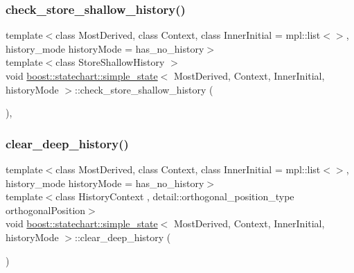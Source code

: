 \mbox{\label{classboost_1_1statechart_1_1simple__state_a526c05c663958e216ab04dbdbf7ba6c5}} 
\subsubsection{\texorpdfstring{check\+\_\+store\+\_\+shallow\+\_\+history()}{check\_store\_shallow\_history()}}
{\footnotesize\ttfamily template$<$class Most\+Derived, class Context, class Inner\+Initial = mpl\+::list$<$$>$, history\+\_\+mode history\+Mode = has\+\_\+no\+\_\+history$>$ \\
template$<$class Store\+Shallow\+History $>$ \\
void \mbox{\hyperlink{classboost_1_1statechart_1_1simple__state}{boost\+::statechart\+::simple\+\_\+state}}$<$ Most\+Derived, Context, Inner\+Initial, history\+Mode $>$\+::check\+\_\+store\+\_\+shallow\+\_\+history (\begin{DoxyParamCaption}{ }\end{DoxyParamCaption})\hspace{0.3cm}{\ttfamily [inline]}, {\ttfamily [private]}}

\mbox{\label{classboost_1_1statechart_1_1simple__state_a23ca1de9d37765cf77884222e0491a5e}} 
\subsubsection{\texorpdfstring{clear\+\_\+deep\+\_\+history()}{clear\_deep\_history()}}
{\footnotesize\ttfamily template$<$class Most\+Derived, class Context, class Inner\+Initial = mpl\+::list$<$$>$, history\+\_\+mode history\+Mode = has\+\_\+no\+\_\+history$>$ \\
template$<$class History\+Context , detail\+::orthogonal\+\_\+position\+\_\+type orthogonal\+Position$>$ \\
void \mbox{\hyperlink{classboost_1_1statechart_1_1simple__state}{boost\+::statechart\+::simple\+\_\+state}}$<$ Most\+Derived, Context, Inner\+Initial, history\+Mode $>$\+::clear\+\_\+deep\+\_\+history (\begin{DoxyParamCaption}{ }\end{DoxyParamCaption})\hspace{0.3cm}{\ttfamily [inline]}}

